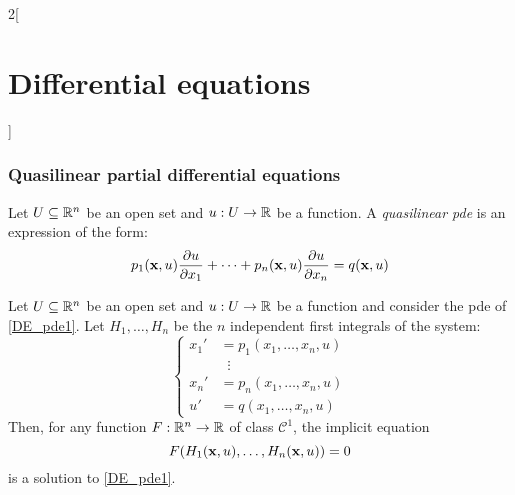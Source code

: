 \documentclass[../../../main_math.tex]{subfiles}
\begin{document}
\begin{multicols}{2}[\section{Differential equations}]
  \subsubsection{Quasilinear partial differential equations}
  \begin{definition}
    Let $U\subseteq \mathbb{R}^n$ be an open set and $u:U\rightarrow\mathbb{R}$ be a function. A \emph{quasilinear pde} is an expression of the form:
    \begin{equation}\label{DE_pde1}
      p_1(\boldsymbol{\mathrm{x}},u)\pdv{u}{x_1}+\cdots+p_n(\boldsymbol{\mathrm{x}},u)\pdv{u}{x_n}=q(\boldsymbol{\mathrm{x}},u)
    \end{equation}
  \end{definition}
  \begin{theorem}
    Let $U\subseteq \mathbb{R}^n$ be an open set and $u:U\rightarrow\mathbb{R}$ be a function and consider the pde of \cref{DE_pde1}. Let $H_1,\ldots,H_{n}$ be the $n$ independent first integrals of the system:
    $$
      \left\{
      \begin{aligned}
        {x_1}' & =p_1(x_1,\ldots,x_n,u) \\
               & \;\;\vdots             \\
        {x_n}' & =p_n(x_1,\ldots,x_n,u) \\
        {u}'   & = q(x_1,\ldots,x_n,u)
      \end{aligned}
      \right.
    $$
    Then, for any function $F:\mathbb{R}^n\rightarrow\mathbb{R}$ of class $\mathcal{C}^1$, the implicit equation $$F(H_1(\boldsymbol{\mathrm{x}},u),\ldots,H_n(\boldsymbol{\mathrm{x}},u))=0$$ is a solution to \cref{DE_pde1}.
  \end{theorem}

\end{multicols}
\end{document}

